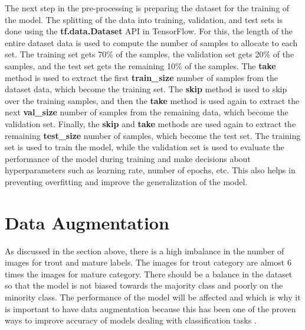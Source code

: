 The next step in the pre-processing is preparing the dataset for the training of the model. The splitting of the data into training, validation, and test sets is done using the \textbf{tf.data.Dataset} API in TensorFlow. For this, the length of the entire dataset data is used to compute the number of samples to allocate to each set. The training set gets 70\% of the samples, the validation set gets 20\% of the samples, and the test set gets the remaining 10\% of the samples. The \textbf{take} method is used to extract the first \textbf{train\_size} number of samples from the dataset data, which become the training set. The \textbf{skip} method is used to skip over the training samples, and then the \textbf{take} method is used again to extract the next \textbf{val\_size} number of samples from the remaining data, which become the validation set. Finally, the \textbf{skip} and \textbf{take} methods are used again to extract the remaining \textbf{test\_size} number of samples, which become the test set. The training set is used to train the model, while the validation set is used to evaluate the performance of the model during training and make decisions about hyperparameters such as learning rate, number of epochs, etc. This also helps in preventing overfitting and improve the generalization of the model.
 

\section{Data Augmentation}

As discussed in the section above, there is a high imbalance in the number of images for trout and mature labels. The images for trout category are almost 6 times the images for mature category. There should be a balance in the dataset so that the model is not biased towards the majority class and poorly on the minority class. The performance of the model will be affected and which is why it is important to have data augmentation because this has been one of the proven ways to improve accuracy of models dealing with classification tasks \cite{perez2017effectiveness}. 

